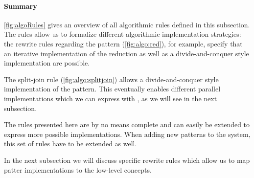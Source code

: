 \paragraph{Summary}
\autoref{fig:algoRules} gives an overview of all algorithmic rules defined in this subsection.
The rules allow us to formalize different algorithmic implementation strategies:
the rewrite rules regarding the \reduce pattern (\autoref{fig:algo:red}), for example, specify that an iterative implementation of the reduction as well as a divide-and-conquer style implementation are possible.

The split-join rule (\autoref{fig:algo:splitjoin}) allows a divide-and-conquer style implementation of the \map pattern.
This eventually enables different parallel implementations which we can express with \OpenCL, as we will see in the next subsection.

The rules presented here are by no means complete and can easily be extended to express more possible implementations.
When adding new patterns to the system, this set of rules have to be extended as well.

In the next subsection we will discuss \OpenCL specific rewrite rules which allow us to map patter implementations to the low-level \OpenCL concepts.

